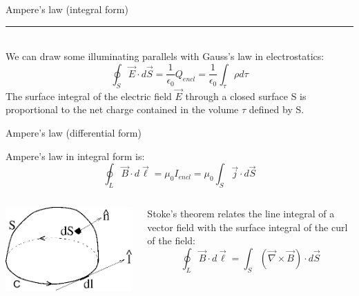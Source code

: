 \begin{frame}{Ampere's law (integral form)}
\vspace{0.2cm}
\noindent\rule{2cm}{0.4pt}\\
{\small
     We can draw some illuminating parallels with Gauss's law in electrostatics:
     \begin{equation*}
        \oint_{S} \vec{E} \cdot d\vec{S} = \frac{1}{\epsilon_0} Q_{encl} = \frac{1}{\epsilon_0} \int_{\tau} \rho d\tau
     \end{equation*}
     The surface integral of the electric field $\vec{E}$  through a closed surface S
     is proportional to the net charge contained in the volume $\tau$ defined by S.
}

\end{frame}

%
%
%

\begin{frame}{Ampere's law (differential form)}

Ampere's law in integral form is:
\begin{equation*}
    \oint_{L} \vec{B} \cdot d\vec{\ell} = \mu_0 I_{encl} = \mu_0 \int_{S} \vec{j} \cdot d\vec{S}
\end{equation*}

\begin{columns}
  \begin{column}{0.25\textwidth}
    \begin{center}
     \includegraphics[width=0.99\textwidth]{./images/schematics/stokes_theorem_C.png}\\
    \end{center}
  \end{column}
  \begin{column}{0.75\textwidth}
     Stoke's theorem relates the line integral of a vector field with the surface integral
     of the curl of the field:
     \begin{equation*}
        \oint_{L} \vec{B} \cdot d\vec{\ell} = \int_{S} (\vec{\nabla} \times \vec{B}) \cdot d\vec{S}
     \end{equation*}
  \end{column}
\end{columns}


\end{frame}
